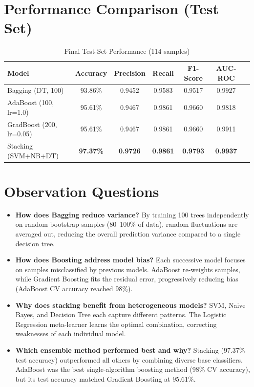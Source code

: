\documentclass[11pt]{article}
\begin{document}
\section*{Performance Comparison (Test Set)}

\begin{table}[H]
\centering
\caption{Final Test-Set Performance (114 samples)}
\begin{tabular}{lcccccc}
\toprule
\textbf{Model} & \textbf{Accuracy} & \textbf{Precision} & \textbf{Recall} & \textbf{F1-Score} & \textbf{AUC-ROC} \\
\midrule
Bagging (DT, 100)         & 93.86\% & 0.9452 & 0.9583 & 0.9517 & 0.9927 \\
AdaBoost (100, lr=1.0)    & 95.61\% & 0.9467 & 0.9861 & 0.9660 & 0.9818 \\
GradBoost (200, lr=0.05)  & 95.61\% & 0.9467 & 0.9861 & 0.9660 & 0.9911 \\
Stacking (SVM+NB+DT)      & \textbf{97.37\%} & \textbf{0.9726} & \textbf{0.9861} & \textbf{0.9793} & \textbf{0.9937} \\
\bottomrule
\end{tabular}
\end{table}

\section*{Observation Questions}
\begin{itemize}
    \item \textbf{How does Bagging reduce variance?} By training 100 trees independently on random bootstrap samples (80--100\% of data), random fluctuations are averaged out, reducing the overall prediction variance compared to a single decision tree.
    \item \textbf{How does Boosting address model bias?} Each successive model focuses on samples misclassified by previous models. AdaBoost re-weights samples, while Gradient Boosting fits the residual error, progressively reducing bias (AdaBoost CV accuracy reached 98\%).
    \item \textbf{Why does stacking benefit from heterogeneous models?} SVM, Naive Bayes, and Decision Tree each capture different patterns. The Logistic Regression meta-learner learns the optimal combination, correcting weaknesses of each individual model.
    \item \textbf{Which ensemble method performed best and why?} Stacking (97.37\% test accuracy) outperformed all others by combining diverse base classifiers. AdaBoost was the best single-algorithm boosting method (98\% CV accuracy), but its test accuracy matched Gradient Boosting at 95.61\%.
\end{itemize}
\end{document}
